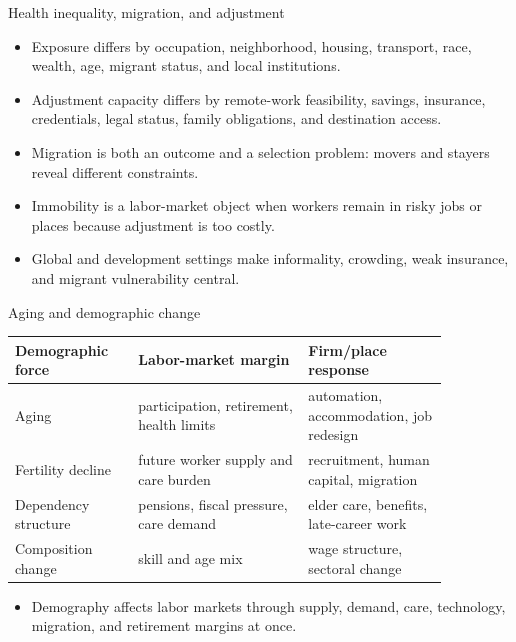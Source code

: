 \documentclass[aspectratio=169,11pt]{beamer}
\begin{document}
\begin{frame}{Health inequality, migration, and adjustment}
\begin{itemize}
    \item Exposure differs by occupation, neighborhood, housing, transport, race, wealth, age, migrant status, and local institutions.
    \item Adjustment capacity differs by remote-work feasibility, savings, insurance, credentials, legal status, family obligations, and destination access.
    \item Migration is both an outcome and a selection problem: movers and stayers reveal different constraints.
    \item Immobility is a labor-market object when workers remain in risky jobs or places because adjustment is too costly.
    \item Global and development settings make informality, crowding, weak insurance, and migrant vulnerability central.
\end{itemize}
\end{frame}

\begin{frame}{Aging and demographic change}
\small
\begin{tabular}{p{0.24\linewidth} p{0.34\linewidth} p{0.28\linewidth}}
\toprule
Demographic force & Labor-market margin & Firm/place response \\
\midrule
Aging & participation, retirement, health limits & automation, accommodation, job redesign \\
Fertility decline & future worker supply and care burden & recruitment, human capital, migration \\
Dependency structure & pensions, fiscal pressure, care demand & elder care, benefits, late-career work \\
Composition change & skill and age mix & wage structure, sectoral change \\
\bottomrule
\end{tabular}
\vspace{0.3cm}
\begin{itemize}
    \item Demography affects labor markets through supply, demand, care, technology, migration, and retirement margins at once.
\end{itemize}
\end{frame}
\end{document}
